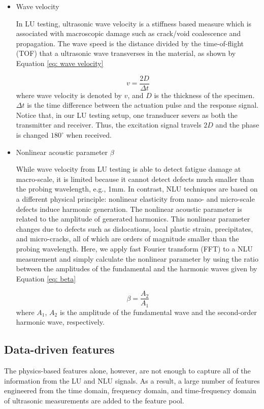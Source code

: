 \begin{itemize}
    \item Wave velocity
    
    In LU testing, ultrasonic wave velocity is a stiffness based measure which is associated with macroscopic damage such as crack/void coalescence and propagation. The wave speed is the distance divided by the time-of-flight (TOF) that a ultrasonic wave transverses in the material, as shown by Equation \eqref{eq: wave velocity}
    
    \begin{equation}
        v = \frac{2D}{\Delta t}
        \label{eq: wave velocity}
    \end{equation}
    where wave velocity is denoted by $v$, and $D$ is the thickness of the specimen. $\Delta t$ is the time difference between the actuation pulse and the response signal. Notice that, in our LU testing setup, one transducer severs as both the transmitter and receiver. Thus, the excitation signal travels $2D$ and the phase is changed $180^{\circ} $ when received.

    \item Nonlinear acoustic parameter $\beta$
    
    While wave velocity from LU testing is able to detect fatigue damage at macro-scale, it is limited because it cannot detect defects much smaller than the probing wavelength, e.g., 1mm. In contrast, NLU techniques are based on a different physical principle: nonlinear elasticity from nano- and micro-scale defects induce harmonic generation. The nonlinear acoustic parameter is related to the amplitude of generated harmonics. This nonlinear parameter changes due to defects such as dislocations, local plastic strain, precipitates, and micro-cracks, all of which are orders of magnitude smaller than the probing wavelength. Here, we apply fast Fourier transform (FFT) to a NLU measurement and simply calculate the nonlinear parameter by using the ratio between the amplitudes of the fundamental and the harmonic waves given by Equation \eqref{eq: beta}

    \begin{equation}
        \beta = \frac{A_2}{A_1}
        \label{eq: beta}
    \end{equation}
    where $A_1$, $A_2$ is the amplitude of the fundamental wave and the second-order harmonic wave, respectively.
\end{itemize}

\subsection{Data-driven features}
The physics-based features alone, however, are not enough to capture all of the information from the LU and NLU signals. As a result, a large number of features engineered from the time domain, frequency domain, and time-frequency domain of ultrasonic measurements are added to the feature pool.


